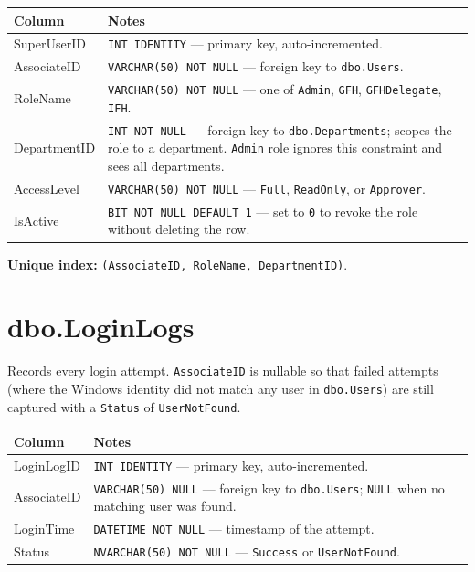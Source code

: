 \documentclass[12pt,a4paper]{report}
\begin{document}
\begin{longtable}{>{\ttfamily}p{4.5cm} >{\raggedright\arraybackslash}p{9.5cm}}
\toprule
\normalfont\textbf{Column} & \textbf{Notes} \\
\midrule
\endhead
SuperUserID  & \texttt{INT IDENTITY} — primary key, auto-incremented. \\
AssociateID  & \texttt{VARCHAR(50) NOT NULL} — foreign key to \texttt{dbo.Users}. \\
RoleName     & \texttt{VARCHAR(50) NOT NULL} — one of \texttt{Admin}, \texttt{GFH},
               \texttt{GFHDelegate}, \texttt{IFH}. \\
DepartmentID & \texttt{INT NOT NULL} — foreign key to \texttt{dbo.Departments}; scopes the
               role to a department. \texttt{Admin} role ignores this constraint and sees all
               departments. \\
AccessLevel  & \texttt{VARCHAR(50) NOT NULL} — \texttt{Full}, \texttt{ReadOnly}, or
               \texttt{Approver}. \\
IsActive     & \texttt{BIT NOT NULL DEFAULT 1} — set to \texttt{0} to revoke the role without
               deleting the row. \\
\bottomrule
\end{longtable}

\textbf{Unique index:} \texttt{(AssociateID, RoleName, DepartmentID)}.

\section{dbo.LoginLogs}

Records every login attempt. \texttt{AssociateID} is nullable so that failed attempts (where
the Windows identity did not match any user in \texttt{dbo.Users}) are still captured with a
\texttt{Status} of \texttt{UserNotFound}.

\begin{longtable}{>{\ttfamily}p{4.5cm} >{\raggedright\arraybackslash}p{9.5cm}}
\toprule
\normalfont\textbf{Column} & \textbf{Notes} \\
\midrule
\endhead
LoginLogID  & \texttt{INT IDENTITY} — primary key, auto-incremented. \\
AssociateID & \texttt{VARCHAR(50) NULL} — foreign key to \texttt{dbo.Users}; \texttt{NULL}
              when no matching user was found. \\
LoginTime   & \texttt{DATETIME NOT NULL} — timestamp of the attempt. \\
Status      & \texttt{NVARCHAR(50) NOT NULL} — \texttt{Success} or \texttt{UserNotFound}. \\
\bottomrule
\end{longtable}
\end{document}
